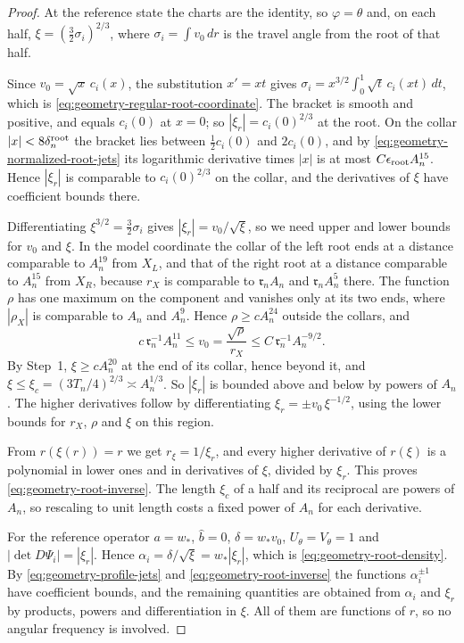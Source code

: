 \begin{proof}
At the reference state the charts are the identity, so
$\varphi=\theta$ and, on each half, $\xi=(\tfrac32\sigma_i)^{2/3}$,
where $\sigma_i=\int v_0\,dr$ is the travel angle from the root of
that half.

Since $v_0=\sqrt x\,c_i(x)$, the substitution $x'=xt$ gives
$\sigma_i=x^{3/2}\int_0^1\sqrt t\,c_i(xt)\,dt$, which is
\eqref{eq:geometry-regular-root-coordinate}. The bracket is smooth
and positive, and equals $c_i(0)$ at $x=0$; so
$|\xi_r|=c_i(0)^{2/3}$ at the root. On the collar
$|x|<8\delta_n^{\rm root}$ the bracket lies between
$\tfrac12c_i(0)$ and $2c_i(0)$, and by
\eqref{eq:geometry-normalized-root-jets} its logarithmic derivative
times $|x|$ is at most $C\epsilon_{\rm root}A_n^{15}$. Hence
$|\xi_r|$ is comparable to $c_i(0)^{2/3}$ on the collar, and the
derivatives of $\xi$ have coefficient bounds there.

Differentiating $\xi^{3/2}=\tfrac32\sigma_i$ gives
$|\xi_r|=v_0/\sqrt\xi$, so we need upper and lower bounds for $v_0$
and $\xi$. In the model coordinate the collar of the left root ends
at a distance comparable to $A_n^{19}$ from $X_L$, and that of the
right root at a distance comparable to $A_n^{15}$ from $X_R$, because
$r_X$ is comparable to $\mathfrak r_nA_n$ and $\mathfrak r_nA_n^5$
there. The function $\rho$ has one maximum on the component and
vanishes only at its two ends, where $|\rho_X|$ is comparable to
$A_n$ and $A_n^9$. Hence $\rho\ge cA_n^{24}$ outside the collars, and
\[
 c\,\mathfrak r_n^{-1}A_n^{11}\le v_0=\frac{\sqrt\rho}{r_X}
 \le C\,\mathfrak r_n^{-1}A_n^{-9/2}.
\]
By Step~1, $\xi\ge cA_n^{20}$ at the end of its collar, hence beyond
it, and $\xi\le\xi_c=(3T_n/4)^{2/3}\asymp A_n^{1/3}$. So $|\xi_r|$ is
bounded above and below by powers of $A_n$. The higher derivatives
follow by differentiating $\xi_r=\pm v_0\,\xi^{-1/2}$, using the lower
bounds for $r_X$, $\rho$ and $\xi$ on this region.

From $r(\xi(r))=r$ we get $r_\xi=1/\xi_r$, and every higher
derivative of $r(\xi)$ is a polynomial in lower ones and in
derivatives of $\xi$, divided by $\xi_r$. This proves
\eqref{eq:geometry-root-inverse}. The length $\xi_c$ of a half and
its reciprocal are powers of $A_n$, so rescaling to unit length costs
a fixed power of $A_n$ for each derivative.

For the reference operator $a=w_*$, $\widehat b=0$,
$\delta=w_*v_0$, $U_\theta=V_\theta=1$ and
$|\det D\Psi_i|=|\xi_r|$. Hence
$\alpha_i=\delta/\sqrt\xi=w_*|\xi_r|$, which is
\eqref{eq:geometry-root-density}. By
\eqref{eq:geometry-profile-jets} and \eqref{eq:geometry-root-inverse}
the functions $\alpha_i^{\pm1}$ have coefficient bounds, and the
remaining quantities are obtained from $\alpha_i$ and $\xi_r$ by
products, powers and differentiation in $\xi$. All of them are
functions of $r$, so no angular frequency is involved.
\end{proof}

